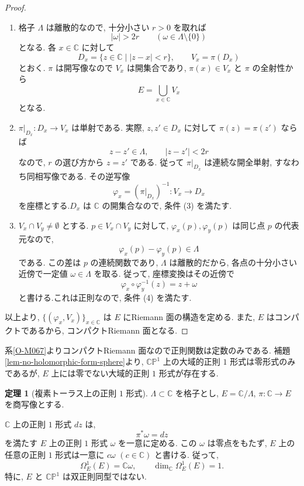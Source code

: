 \documentclass[dvipdfmx,a4paper,11pt]{article} %
\newcommand{\C}{\mathbb{C}}
\theoremstyle{definition}
\newtheorem{thm}{定理}[section]
\numberwithin{equation}{section}
\begin{document}
\begin{proof}
\begin{enumerate}
\begin{figure}[htbp]
\end{figure}

これから$E$は$S^1\times S^1$ と同相であり,第 $2$ 可算連結コンパクトHausdorff空間である.
\footnote{かなりギャップがあるが面倒なのでこれで済ませる. }
 
\item
格子 $\Lambda$ は離散的なので, 十分小さい $r>0$ を取れば
\[
|\omega|>2r\qquad(\omega\in\Lambda\setminus\{0\})
\]
となる.
各 $x\in\C$ に対して
\[
D_x=\{z\in\C\mid |z-x|<r\},\qquad V_x=\pi(D_x)
\]
とおく.
$\pi$ は開写像なので $V_x$ は開集合であり, 
$\pi(x)\in V_x$ と $\pi$ の全射性から
\[
E=\bigcup_{x\in\C}V_x
\]
となる.

\item
$\pi|_{D_x}:D_x\to V_x$ は単射である.
実際, $z,z'\in D_x$ に対して $\pi(z)=\pi(z')$ ならば
\[
z-z'\in\Lambda,\qquad |z-z'|<2r
\]
なので, $r$ の選び方から $z=z'$ である.
従って $\pi|_{D_x}$ は連続な開全単射, すなわち同相写像である.
その逆写像
\[
\varphi_x=(\pi|_{D_x})^{-1}:V_x\to D_x
\]
を座標とする.$D_x$ は $\C$ の開集合なので, 条件 (3) を満たす.

\item
$V_x\cap V_y\neq\emptyset$ とする.
$p\in V_x\cap V_y$ に対して, 
$\varphi_x(p),\varphi_y(p)$ は同じ点 $p$ の代表元なので, 
\[
\varphi_x(p)-\varphi_y(p)\in\Lambda
\]
である.
この差は $p$ の連続関数であり, $\Lambda$ は離散的だから, 
各点の十分小さい近傍で一定値 $\omega\in\Lambda$ を取る.
従って, 座標変換はその近傍で
\[
\varphi_x\circ\varphi_y^{-1}(z)=z+\omega
\]
と書ける.これは正則なので, 条件 (4) を満たす.
\end{enumerate}

以上より, $\{(\varphi_x,V_x)\}_{x\in\C}$ は
$E$ にRiemann 面の構造を定める.
また, $E$ はコンパクトであるから, コンパクトRiemann 面となる.

\end{proof}


系\ref{O-M067}よりコンパクトRiemann 面なので正則関数は定数のみである. 
補題\ref{lem-no-holomorphic-form-sphere}より, $\C\mathbb P^1$ 上の大域的正則 $1$ 形式は零形式のみであるが, $E$ 上には零でない大域的正則 $1$ 形式が存在する. 

\begin{thm}[複素トーラス上の正則 $1$ 形式]\label{O-M139}
$\Lambda\subset\C$ を格子とし,
$E=\C/\Lambda$, $\pi:\C\to E$ を商写像とする.

$\C$ 上の正則 $1$ 形式 $dz$ は,
\[
\pi^*\omega=dz
\]
を満たす $E$ 上の正則 $1$ 形式 $\omega$ を一意に定める.
この $\omega$ は零点をもたず,
$E$ 上の任意の正則 $1$ 形式は一意に $c\omega$ $(c\in\C)$ と書ける.
従って,
\[
\Omega_E^1(E)=\C\omega,\qquad
\dim_\C\Omega_E^1(E)=1.
\]
特に, $E$ と $\C\mathbb P^1$ は双正則同型ではない.
\end{thm}
\end{document}
